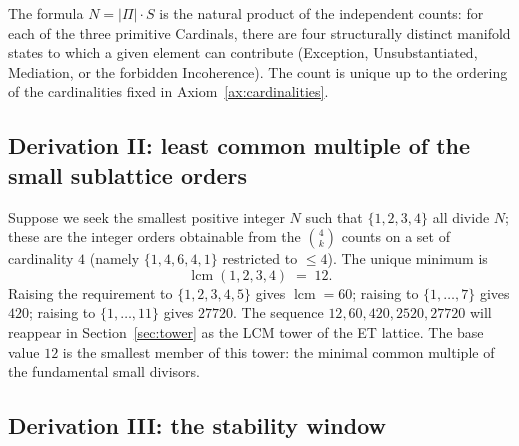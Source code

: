 \documentclass[11pt,a4paper]{article}
\theoremstyle{definition}
\theoremstyle{remark}
\DeclareMathOperator{\lcm}{lcm}
\begin{document}
The formula $N = |\Pi|\cdot S$ is the natural product of the independent counts: for each of the three primitive Cardinals, there are four structurally distinct manifold states to which a given element can contribute (Exception, Unsubstantiated, Mediation, or the forbidden Incoherence). The count is unique up to the ordering of the cardinalities fixed in Axiom~\ref{ax:cardinalities}.

\subsection{Derivation II: least common multiple of the small sublattice orders}

Suppose we seek the smallest positive integer $N$ such that $\{1,2,3,4\}$ all divide $N$; these are the integer orders obtainable from the $\binom{4}{k}$ counts on a set of cardinality $4$ (namely $\{1,4,6,4,1\}$ restricted to $\le 4$). The unique minimum is
\[
\lcm(1,2,3,4) \;=\; 12.
\]
Raising the requirement to $\{1,2,3,4,5\}$ gives $\lcm=60$; raising to $\{1,\ldots,7\}$ gives $420$; raising to $\{1,\ldots,11\}$ gives $27720$. The sequence $12,60,420,2520,27720$ will reappear in Section~\ref{sec:tower} as the LCM tower of the ET lattice. The base value $12$ is the smallest member of this tower: the minimal common multiple of the fundamental small divisors.

\subsection{Derivation III: the stability window}
\end{document}
